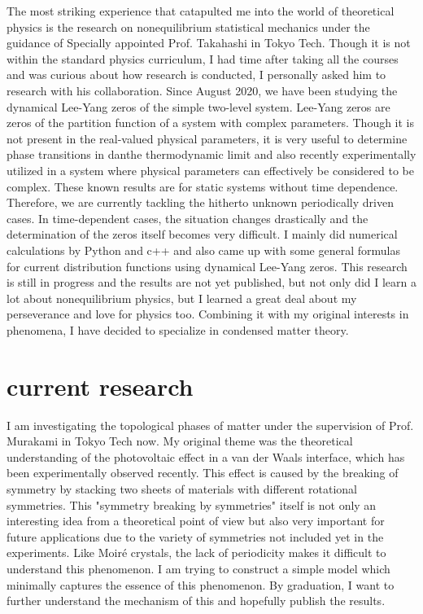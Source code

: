 \documentclass[a4]{article}
\begin{document}
The most striking experience that catapulted me into the world of theoretical physics is the research on nonequilibrium statistical mechanics under the guidance of Specially appointed Prof. Takahashi in Tokyo Tech. Though it is not within the standard physics curriculum, I had time after taking all the courses and was curious about how research is conducted, I personally asked him to research with his collaboration. Since August 2020, we have been studying the dynamical Lee-Yang zeros of the simple two-level system. Lee-Yang zeros are zeros of the partition function of a system with complex parameters. Though it is not present in the real-valued physical parameters, it is very useful to determine phase transitions in danthe thermodynamic limit and also recently experimentally utilized in a system where physical parameters can effectively be considered to be complex. These known results are for static systems without time dependence. Therefore, we are currently tackling the hitherto unknown periodically driven cases. In time-dependent cases, the situation changes drastically and the determination of the zeros itself becomes very difficult. I mainly did numerical calculations by Python and c++ and also came up with some general formulas for current distribution functions using dynamical Lee-Yang zeros. This research is still in progress and the results are not yet published, but not only did I learn a lot about nonequilibrium physics, but I learned a great deal about my perseverance and love for physics too. Combining it with my original interests in phenomena, I have decided to specialize in condensed matter theory.\par

\section{current research}
I am investigating the topological phases of matter under the supervision of Prof. Murakami in Tokyo Tech now. My original theme was the theoretical understanding of the photovoltaic effect in a van der Waals interface, which has been experimentally observed recently. This effect is caused by the breaking of symmetry by stacking two sheets of materials with different rotational symmetries. This "symmetry breaking by symmetries" itself is not only an interesting idea from a theoretical point of view but also very important for future applications due to the variety of symmetries not included yet in the experiments. Like Moir\'{e} crystals, the lack of periodicity makes it difficult to understand this phenomenon. I am trying to construct a simple model which minimally captures the essence of this phenomenon. By graduation, I want to further understand the mechanism of this and hopefully publish the results. \par
\end{document}

